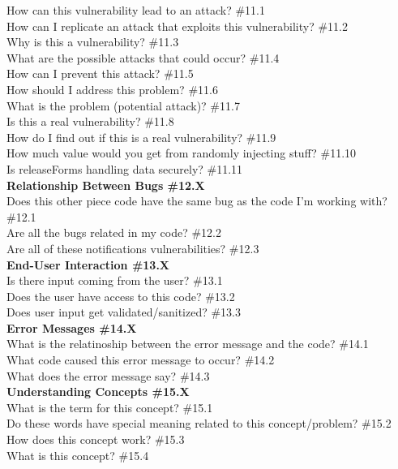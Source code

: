 \documentclass[10pt,journal,compsoc]{IEEEtran}
\begin{document}
	How can this vulnerability lead to an attack?  \#11.1 \\
	How can I replicate an attack that exploits this vulnerability? \#11.2 \\
	Why is this a vulnerability? \#11.3 \\
	What are the possible attacks that could occur? \#11.4  \\
	How can I prevent this attack? \#11.5 \\
	How should I address this problem?  \#11.6 \\
	What is the problem (potential attack)? \#11.7 \\
	Is this a real vulnerability? \#11.8 \\
	How do I find out if this is a real vulnerability? \#11.9 \\
	How much value would you get from randomly injecting stuff? \#11.10 \\
	Is releaseForms handling data securely? \#11.11 \\
\textbf{Relationship Between Bugs \#12.X} \\
	Does this other piece code have the same bug as the code I'm working with?  \#12.1 \\
	Are all the bugs related in my code? \#12.2 \\
	Are all of these notifications vulnerabilities?  \#12.3 \\
\textbf{End-User Interaction \#13.X} \\
	Is there input coming from the user? \#13.1 \\
	Does the user have access to this code? \#13.2 \\
	Does user input get validated/sanitized? \#13.3 \\
\textbf{Error Messages \#14.X} \\
	What is the relatinoship between the error message and the code? \#14.1 \\
	What code caused this error message to occur? \#14.2 \\
	What does the error message say? \#14.3 \\
\textbf{Understanding Concepts \#15.X} \\
	What is the term for this concept? \#15.1 \\
	Do these words have special meaning related to this concept/problem? \#15.2 \\
	How does this concept work? \#15.3 \\
	What is this concept? \#15.4 \\
\end{document}
